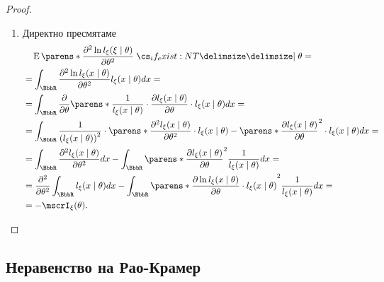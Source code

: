 \documentclass{../../common/topic}
\begin{document}
\begin{proof}
\begin{enumerate}
    \item Директно пресмятаме
    \begin{align*}
      &\quad\Expect\parens*{ \frac {\partial^2 \ln l_\xi(\xi \given \theta)} {\partial \theta^2} \given* \theta }
      = \\ &=
      \int_{\BbbR} \frac {\partial^2 \ln l_\xi(x \given \theta)} {\partial \theta^2} l_\xi(x \given \theta) dx
      = \\ &=
      \int_{\BbbR} \frac \partial {\partial \theta} \parens*{\frac 1 {l_\xi(x \given \theta)} \cdot \frac {\partial l_\xi(x \given \theta)} {\partial \theta} } \cdot l_\xi(x \given \theta) dx
      = \\ &=
      \int_{\BbbR} \frac 1 {{(l_\xi(x \given \theta))}^2} \cdot \parens*{ \frac {\partial^2 l_\xi(x \given \theta)} {\partial \theta^2} \cdot l_\xi(x \given \theta) - {\parens*{\frac {\partial l_\xi(x \given \theta)} {\partial \theta} }}^2 } \cdot l_\xi(x \given \theta) dx
      = \\ &=
      \int_{\BbbR} \frac {\partial^2 l_\xi(x \given \theta)} {\partial \theta^2} dx - \int_{\BbbR} {\parens*{\frac {\partial l_\xi(x \given \theta)} {\partial \theta} }}^2 \frac 1 {l_\xi(x \given \theta)} dx
      = \\ &=
      \frac {\partial^2} {\partial \theta^2} \int_{\BbbR} l_\xi(x \given \theta) dx - \int_{\BbbR} {\parens*{\frac {\partial \ln l_\xi(x \given \theta)} {\partial \theta} \cdot l_\xi(x \given \theta) }}^2 \frac 1 {l_\xi(x \given \theta)} dx
      = \\ &=
      -\mscrI_\xi(\theta).
    \end{align*}
  \end{enumerate}
\end{proof}

\subsection{Неравенство на Рао-Крамер}
\end{document}
